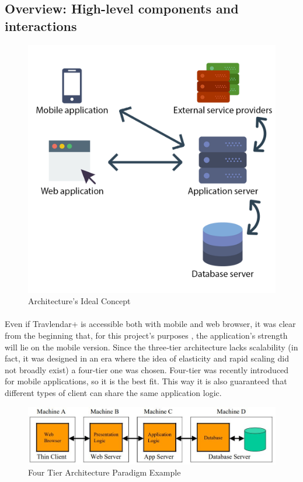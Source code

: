 \documentclass{article}
\begin{document}
		\subsection{Overview: High-level components and interactions}
			\begin{figure}[H]
			\includegraphics[width=\linewidth]{Images/Architecture/Architecture_design_2.png}
			\caption{Architecture's Ideal Concept}
			\label{fig:AC}
			\end{figure}
			\paragraph{}
Even if Travlendar+ is accessible both with mobile and web browser, it was clear from the beginning that, for this project’s purposes , the application’s strength will lie on the mobile version. Since   
the three‑tier architecture lacks scalability (in fact, it was designed in an era where the idea of elasticity and rapid scaling did not broadly exist) a four-tier one was chosen. Four-tier was recently introduced for mobile applications, so it is the best fit. This way it is also guaranteed that different types of client can share the same application logic. 
			\begin{figure}[H]
			\includegraphics[width=\linewidth]{Images/Architecture/4_Tier_Architecture.jpg}
			\caption{Four Tier Architecture Paradigm Example}
			\label{fig:4TA}
			\end{figure}
\end{document}
